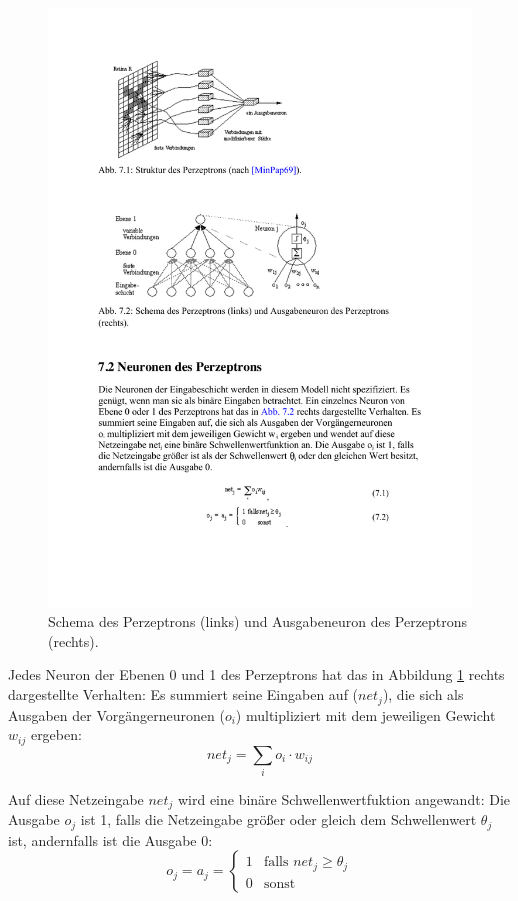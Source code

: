 \begin{figure}[ht!] \centering 
	\includegraphics[width=\linewidth]{figures/ch02_perzeptron-schema.pdf}
	\caption{Schema des Perzeptrons (links) und Ausgabeneuron des Perzeptrons (rechts).}
	\label{fig:perzeptron-schema}
\end{figure}

Jedes Neuron der Ebenen 0 und 1 des Perzeptrons hat das in Abbildung \ref{fig:perzeptron-schema} rechts dargestellte Verhalten: Es summiert seine Eingaben auf ($net_j$), die sich als Ausgaben der Vorgängerneuronen ($o_i$) multipliziert mit dem jeweiligen Gewicht $w_{ij}$ ergeben: 
\[
	net_j = \sum_i o_i \cdot w_{ij}
\]

 Auf diese Netzeingabe $net_j$ wird eine binäre Schwellenwertfuktion angewandt: Die Ausgabe $o_j$ ist 1, falls die Netzeingabe größer oder gleich dem Schwellenwert $\theta_j$ ist, andernfalls ist die Ausgabe 0:
\[
	o_j = a_j = 
	\begin{cases}
		1 &\text{falls } net_j \ge \theta_j \\
		0 &\text{sonst}
	\end{cases}
\]

